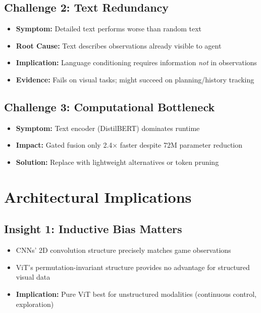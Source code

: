 \documentclass[12pt,a4paper,openany]{report}
\begin{document}
\subsection{Challenge 2: Text Redundancy}

\begin{itemize}
    \item \textbf{Symptom:} Detailed text performs worse than random text
    \item \textbf{Root Cause:} Text describes observations already visible to agent
    \item \textbf{Implication:} Language conditioning requires information \textit{not} in observations
    \item \textbf{Evidence:} Fails on visual tasks; might succeed on planning/history tracking
\end{itemize}

\subsection{Challenge 3: Computational Bottleneck}

\begin{itemize}
    \item \textbf{Symptom:} Text encoder (DistilBERT) dominates runtime
    \item \textbf{Impact:} Gated fusion only 2.4$\times$ faster despite 72M parameter reduction
    \item \textbf{Solution:} Replace with lightweight alternatives or token pruning
\end{itemize}

\section{Architectural Implications}

\subsection{Insight 1: Inductive Bias Matters}

\begin{itemize}
    \item CNNs' 2D convolution structure precisely matches game observations
    \item ViT's permutation-invariant structure provides no advantage for structured visual data
    \item \textbf{Implication:} Pure ViT best for unstructured modalities (continuous control, exploration)
\end{itemize}
\end{document}

